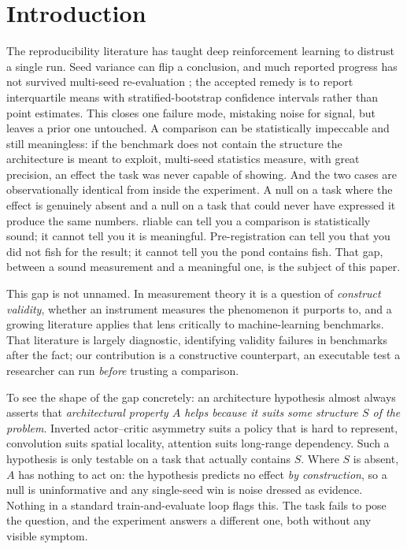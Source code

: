 \documentclass[10pt]{article}
\begin{document}
\section{Introduction}
\label{sec:intro}

The reproducibility literature has taught deep reinforcement learning to distrust a single
run. Seed variance can flip a conclusion, and much reported progress has not survived
multi-seed re-evaluation \citep{henderson2018matters,agarwal2021precipice}; the accepted
remedy is to report interquartile means with stratified-bootstrap confidence intervals
rather than point estimates. This closes one failure mode, mistaking noise for signal, but
leaves a prior one untouched. A comparison can be statistically impeccable and still
meaningless: if the benchmark does not contain the structure the architecture is meant to
exploit, multi-seed statistics measure, with great precision, an effect the task was never
capable of showing. And the two cases are observationally identical from inside the
experiment. A null on a task where the effect is genuinely absent and a null on a task that
could never have expressed it produce the same numbers. rliable can tell you a comparison
is statistically sound; it cannot tell you it is meaningful. Pre-registration can tell you
that you did not fish for the result; it cannot tell you the pond contains fish. That gap,
between a sound measurement and a meaningful one, is the subject of this paper.

This gap is not unnamed. In measurement theory it is a question of \emph{construct
validity}, whether an instrument measures the phenomenon it purports to, and a growing
literature applies that lens critically to machine-learning benchmarks. That literature is
largely diagnostic, identifying validity failures in benchmarks after the fact; our
contribution is a constructive counterpart, an executable test a researcher can run
\emph{before} trusting a comparison.

To see the shape of the gap concretely: an architecture hypothesis almost always asserts
that \emph{architectural property $A$ helps because it suits some structure $S$ of the
problem}. Inverted actor--critic asymmetry suits a policy that is hard to represent,
convolution suits spatial locality, attention suits long-range dependency. Such a
hypothesis is only testable on a task that actually contains $S$. Where $S$ is absent, $A$
has nothing to act on: the hypothesis predicts no effect \emph{by construction}, so a null
is uninformative and any single-seed win is noise dressed as evidence. Nothing in a
standard train-and-evaluate loop flags this. The task fails to pose the question, and the
experiment answers a different one, both without any visible symptom.
\end{document}
